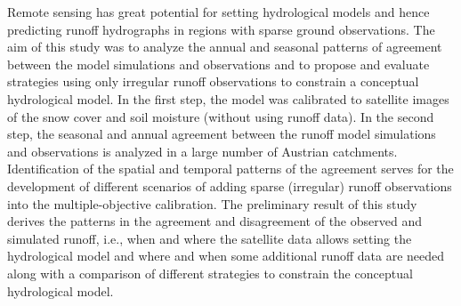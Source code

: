 Remote sensing has great potential for setting hydrological models and hence predicting runoff hydrographs in regions with sparse ground observations. The aim of this study was to analyze the annual and seasonal patterns of agreement between the model simulations and observations and to propose and evaluate strategies using only irregular runoff observations to constrain a conceptual hydrological model. In the first step, the model was calibrated to satellite images of the snow cover and soil moisture (without using runoff data). In the second step, the seasonal and annual agreement between the runoff model simulations and observations is analyzed in a large number of Austrian catchments. Identification of the spatial and temporal patterns of the agreement serves for the development of different scenarios of adding sparse (irregular) runoff observations into the multiple-objective calibration. The preliminary result of this study derives the patterns in the agreement and disagreement of the observed and simulated runoff, i.e., when and where the satellite data allows setting the hydrological model and where and when some additional runoff data are needed along with a comparison of different strategies to constrain the conceptual hydrological model.
\newpage{}
{}
\begin{flushleft}






\end{flushleft}

\noindent

